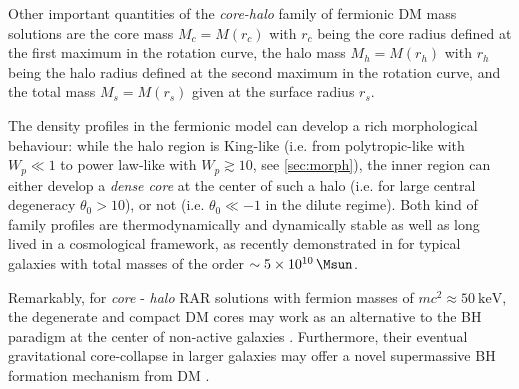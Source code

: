 Other important quantities of the \textit{core-halo} family of fermionic DM mass solutions are the core mass $M_c = M(r_c)$ with $r_c$ being the core radius defined at the first maximum in the rotation curve, the halo mass $M_h = M(r_h)$ with $r_h$ being the halo radius defined at the second maximum in the rotation curve, and the total mass $M_s = M(r_s)$ given at the surface radius $r_s$.

The density profiles in the fermionic model can develop a rich morphological behaviour: while the halo region is King-like (i.e. from polytropic-like with $W_p \ll 1$ to power law-like with $W_p \gtrsim 10$, see \ref{sec:morph}), the inner region can either develop a \textit{dense core} at the center of such a halo (i.e. for large central degeneracy $\theta_0 > 10$), or not (i.e. $\theta_0 \ll -1$ in the dilute regime). Both kind of family profiles are thermodynamically and dynamically stable as well as long lived in a cosmological framework, as recently demonstrated in \citet{2021MNRAS.502.4227A} for typical galaxies with total masses of the order $\sim \SI{5E10}{\Msun}$.

Remarkably, for \textit{core} - \textit{halo} RAR solutions with fermion masses of $m c^2\approx \SI{50}{\kilo\eV}$, the degenerate and compact DM cores may work as an alternative to the BH paradigm at the center of non-active galaxies \citep{2018PDU....21...82A,2019PDU....24..278A,2020A&A...641A..34B,2021MNRAS.505L..64B,2022MNRAS.511L..35A}. Furthermore, their eventual gravitational core-collapse in larger galaxies may offer a novel supermassive BH formation mechanism from DM \citep{2021MNRAS.502.4227A}.
